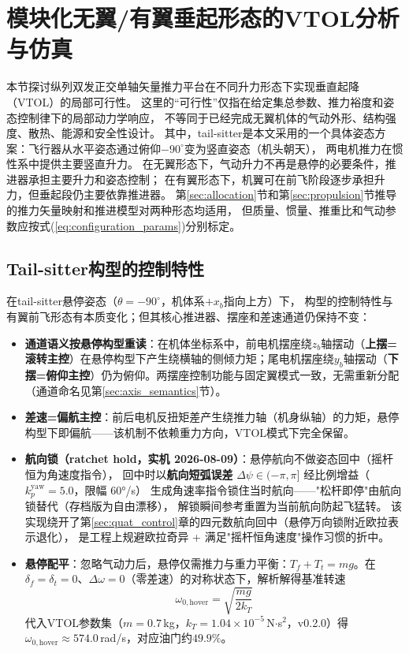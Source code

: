 \section{模块化无翼/有翼垂起形态的VTOL分析与仿真}
\label{sec:vtol}

本节探讨纵列双发正交单轴矢量推力平台在不同升力形态下实现垂直起降（VTOL）的局部可行性。
这里的“可行性”仅指在给定集总参数、推力裕度和姿态控制律下的局部动力学响应，
不等同于已经完成无翼机体的气动外形、结构强度、散热、能源和安全性设计。
其中，tail-sitter是本文采用的一个具体姿态方案：飞行器从水平姿态通过俯仰$-90^\circ$变为竖直姿态（机头朝天），
两电机推力在惯性系中提供主要竖直升力。
在无翼形态下，气动升力不再是悬停的必要条件，推进器承担主要升力和姿态控制；
在有翼形态下，机翼可在前飞阶段逐步承担升力，但垂起段仍主要依靠推进器。
第\ref{sec:allocation}节和第\ref{sec:propulsion}节推导的推力矢量映射和推进模型对两种形态均适用，
但质量、惯量、推重比和气动参数应按式(\ref{eq:configuration_params})分别标定。

\subsection{Tail-sitter构型的控制特性}

在tail-sitter悬停姿态（$\theta=-90^\circ$，机体系$+x_b$指向上方）下，
构型的控制特性与有翼前飞形态有本质变化；但其核心推进器、摆座和差速通道仍保持不变：

\begin{itemize}
    \item \textbf{通道语义按悬停构型重读}：在机体坐标系中，前电机摆座绕$z_b$轴摆动（\textbf{上摆=滚转主控}）在悬停构型下产生绕横轴的侧倾力矩；尾电机摆座绕$y_b$轴摆动（\textbf{下摆=俯仰主控}）仍为俯仰。两摆座控制功能与固定翼模式一致，无需重新分配（通道命名见第\ref{sec:axis_semantics}节）。
    \item \textbf{差速=偏航主控}：前后电机反扭矩差产生绕推力轴（机身纵轴）的力矩，悬停构型下即偏航——该机制不依赖重力方向，VTOL模式下完全保留。
\item \textbf{航向锁（ratchet hold，实机 2026-08-09）}：悬停航向不做姿态回中（摇杆恒为角速度指令），
回中时以\textbf{航向短弧误差} $\Delta\psi\in(-\pi,\pi]$ 经比例增益（$k_p^{\text{yaw}}=5.0$，限幅 60°/s）
生成角速率指令锁住当时航向——"松杆即停"由航向锁替代（存档版为自由漂移），
解锁瞬间参考重置为当前航向防起飞猛转。
该实现绕开了第\ref{sec:quat_control}章的四元数航向回中（悬停万向锁附近欧拉表示退化），
是工程上规避欧拉奇异 + 满足"摇杆恒角速度"操作习惯的折中。
    \item \textbf{悬停配平}：忽略气动力后，悬停仅需推力与重力平衡：$T_f+T_t = mg$。在$\delta_f=\delta_t=0$、$\Delta\omega=0$（零差速）的对称状态下，解析解得基准转速
    \begin{equation}
        \omega_{0,\text{hover}} = \sqrt{\frac{mg}{2k_T}}
        \label{eq:hover_omega0}
    \end{equation}
    代入VTOL参数集（$m=0.7$\,kg，$k_T=1.04\times10^{-5}$\,N$\cdot$s$^2$，v0.2.0）得$\omega_{0,\text{hover}} \approx 574.0$\,rad/s，对应油门约$49.9\%$。
\end{itemize}

